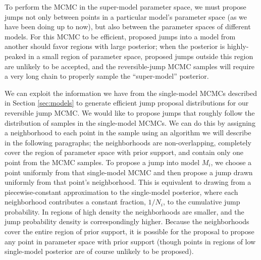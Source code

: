 \documentclass[preprint]{aastex}
\begin{document}
To perform the MCMC in the super-model parameter space, we must
propose jumps not only between points in a particular model's
parameter space (as we have been doing up to now), but also between
the parameter spaces of different models.  For this MCMC to be
efficient, proposed jumps into a model from another should favor
regions with large posterior; when the posterior is highly-peaked in a
small region of parameter space, proposed jumps outside this region
are unlikely to be accepted, and the reversible-jump MCMC samples will
require a very long chain to properly sample the ``super-model''
posterior.  

We can exploit the information we have from the single-model MCMCs
described in Section \ref{sec:models} to generate efficient jump
proposal distributions for our reversible jump MCMC.  We would like to
propose jumps that roughly follow the distribution of samples in the
single-model MCMCs.  We can do this by assigning a neighborhood to
each point in the sample using an algorithm we will describe in the
following paragraphs; the neighborhoods are non-overlapping,
completely cover the region of parameter space with prior support, and
contain only one point from the MCMC samples.  To propose a jump into
model $M_i$, we choose a point uniformly from that single-model MCMC
and then propose a jump drawn uniformly from that point's
neighborhood.  This is equivalent to drawing from a piecewise-constant
approximation to the single-model posterior, where each neighborhood
contributes a constant fraction, $1/N_i$, to the cumulative jump
probability.  In regions of high density the neighborhoods are
smaller, and the jump probability density is correspondingly higher.
Because the neighborhoods cover the entire region of prior support, it
is possible for the proposal to propose any point in parameter space
with prior support (though points in regions of low single-model
posterior are of course unlikely to be proposed).
\end{document}
